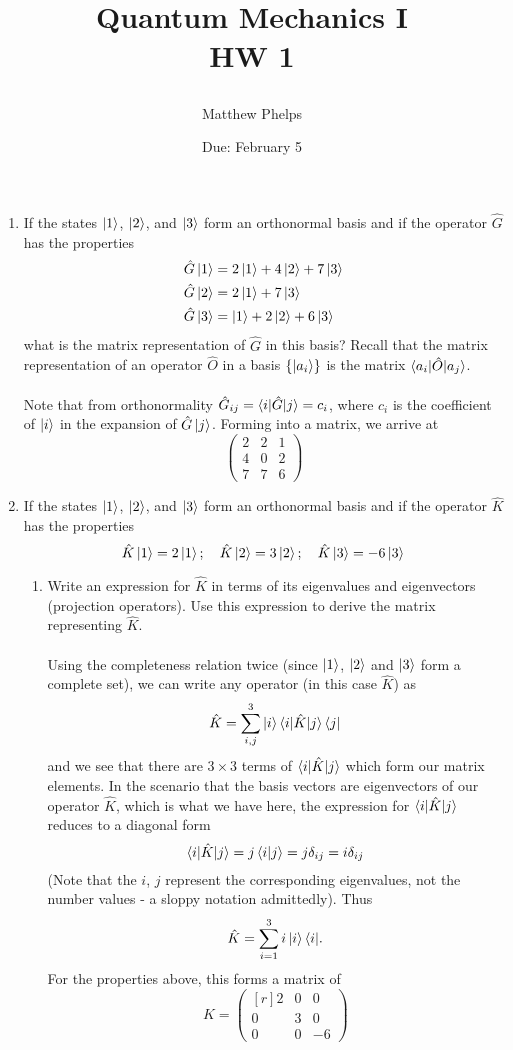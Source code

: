 \documentclass[11pt,letterpaper]{article}
\title{\begin{spacing}{1.2}Quantum Mechanics I\\HW 1\end{spacing}}
\author{Matthew Phelps}
\date{Due: February 5}
\begin{document}
\maketitle

\begin{enumerate}
  \item If the states $\ket{1}$, $\ket{2}$, and $\ket{3}$ form an orthonormal basis and if the operator $\hat{G}$ has the properties
  \begin{align*}
  \hat{G}\ket{1}&=2\ket{1}+4\ket{2}+7\ket{3}\\
  \hat{G}\ket{2}&=2\ket{1}+7\ket{3}\\
  \hat{G}\ket{3}&=\ket{1}+2\ket{2}+6\ket{3}\end{align*}
what is the matrix representation of $\hat{G}$ in this basis? Recall that the matrix representation of an operator $\hat{O}$ in a basis $\{\ket{a_i}\}$ is the matrix $\braket{a_i | \hat{O} | a_j}$.
\\ \\Note that from orthonormality $\hat G_{ij} = \braket{i | \hat G | j} = c_i$, where $c_i$ is the coefficient of $\ket{i}$ in the expansion of $\hat G\ket j$. Forming into a matrix, we arrive at 
  $$\begin{pmatrix}
  2 & 2 & 1 \\4 & 0 & 2 \\ 7 & 7 & 6 
  \end{pmatrix}$$
  
  \item If the states $\ket 1$, $\ket 2$, and $\ket 3$ form an orthonormal basis and if the operator $\hat K$ has the properties 
  $$\hat K\ket 1 = 2\ket 1;\quad \hat K\ket 2 = 3 \ket 2;\quad  \hat K\ket 3 = -6 \ket 3 $$
  \begin{enumerate}
  \item Write an expression for $\hat K$ in terms of its eigenvalues and eigenvectors (projection operators). Use this expression to derive the matrix representing $\hat K$. 
\\ \\Using the completeness relation twice (since $\ket 1$, $\ket 2$ and $\ket 3$ form a complete set), we can write any operator (in this case $\hat K$) as 
 $$ \hat K = \sum_{i,j}^3{\ket i\braket{i|\hat K|j}\bra j} $$
 and we see that there are $3\times 3$ terms of $\braket{i|\hat K|j}$ which form our matrix elements. In the scenario that the basis vectors are eigenvectors of our operator $\hat K$, which is what we have here, the expression for $\braket{i|\hat K|j}$ reduces to a diagonal form
 $$\braket{i|\hat K|j} = j\braket{i|j} = j\delta_{ij} = i\delta_{ij}$$
 (Note that the $i$, $j$ represent the corresponding eigenvalues, not the number values - a sloppy notation admittedly). Thus
 $$\hat K = \sum_{i=1}^{3}{i\ket i\bra i}.$$
 For the properties above, this forms a matrix of
 $$\hat K = \begin{pmatrix*}[r]2&0&0\\0&3&0\\0&0&-6\end{pmatrix*}$$


\end{enumerate}
\end{enumerate}
\end{document}
